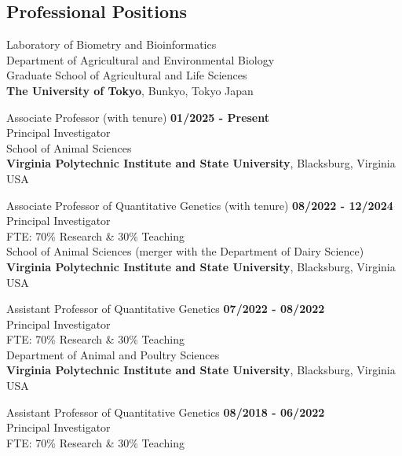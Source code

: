 \documentclass[margin,line,10pt]{res}
\begin{document}
\begin{resume}
\vspace{0.4cm}
\section{\sc Professional Positions}


Laboratory of Biometry and Bioinformatics \\
Department of Agricultural and Environmental Biology \\
Graduate School of Agricultural and Life Sciences \\
{\bf The University of Tokyo}, Bunkyo, Tokyo Japan
\vspace{-.3cm}

Associate Professor (with tenure)  \hfill {\bf 01/2025 - Present}\\
Principal Investigator \\



School of Animal Sciences\\
{\bf Virginia Polytechnic Institute and State University}, Blacksburg, Virginia USA
\vspace{-.3cm}

Associate Professor of Quantitative Genetics (with tenure)  \hfill {\bf 08/2022 - 12/2024}\\
Principal Investigator \\
FTE: 70\% Research \& 30\% Teaching \\


School of Animal Sciences (merger with the Department of Dairy Science)\\
{\bf Virginia Polytechnic Institute and State University}, Blacksburg, Virginia USA
\vspace{-.3cm}

Assistant Professor of Quantitative Genetics   \hfill {\bf 07/2022 - 08/2022}\\
Principal Investigator \\
FTE: 70\% Research \& 30\% Teaching \\


Department of Animal and Poultry Sciences\\
{\bf Virginia Polytechnic Institute and State University}, Blacksburg, Virginia USA
\vspace{-.3cm}

Assistant Professor of Quantitative Genetics   \hfill {\bf 08/2018 - 06/2022}\\
Principal Investigator \\
FTE: 70\% Research \& 30\% Teaching \\




\end{resume}
\end{document}
